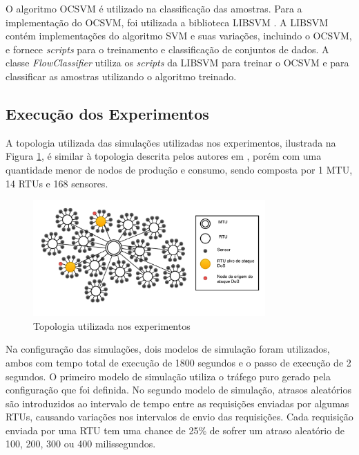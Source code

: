 \documentclass[12pt]{article}
\begin{document}
O algoritmo OCSVM é utilizado na classificação das amostras. Para a implementação do OCSVM, foi utilizada a biblioteca LIBSVM \cite{libsvm}. A LIBSVM contém implementações do algoritmo SVM e suas variações, incluindo o OCSVM, e fornece \emph{scripts} para o treinamento e classificação de conjuntos de dados. A classe \emph{FlowClassifier} utiliza os \emph{scripts} da LIBSVM para  treinar o OCSVM e para classificar as amostras utilizando o algoritmo treinado.

\subsection{Execução dos Experimentos}
\label{sectionexp}
A topologia utilizada das simulações utilizadas nos experimentos, ilustrada na Figura \ref{figtopology}, é similar à topologia descrita pelos autores em \cite{wermann2015astoria}, porém com uma quantidade menor de nodos de produção e consumo, sendo composta por 1 MTU, 14 RTUs e 168 sensores.

\begin{figure}[h]
   \caption{Topologia utilizada nos experimentos}
   \begin{center}
       \includegraphics[width=24em]{topologia}
   \end{center}
   \label{figtopology}
\end{figure}

Na configuração das simulações, dois modelos de simulação foram utilizados, ambos com tempo total de execução de 1800 segundos e o passo de execução de 2 segundos. O primeiro modelo de simulação utiliza o tráfego puro gerado pela configuração que foi definida. No segundo modelo de simulação, atrasos aleatórios são introduzidos ao intervalo de tempo entre as requisições enviadas por algumas RTUs, causando variações nos intervalos de envio das requisições. Cada requisição enviada por uma RTU tem uma chance de 25\% de sofrer um atraso aleatório de 100, 200, 300 ou 400 milissegundos.
\end{document}
